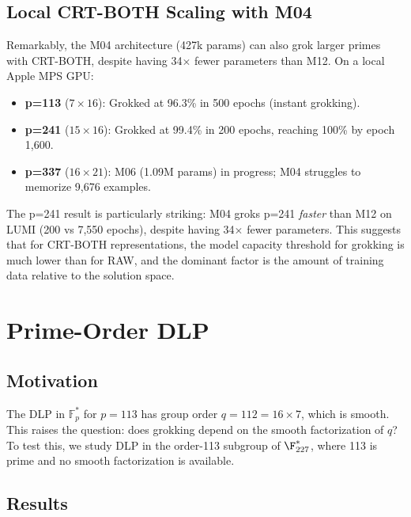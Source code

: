 \documentclass[11pt]{article}
\newcommand{\Fps}{\mathbb{F}_p^*}
\begin{document}
\subsection{Local CRT-BOTH Scaling with M04}
\label{sec:local_crt_scaling}

Remarkably, the M04 architecture (427k params) can also grok larger primes with CRT-BOTH, despite having 34$\times$ fewer parameters than M12. On a local Apple MPS GPU:

\begin{itemize}[leftmargin=*]
    \item \textbf{p=113} ($7 \times 16$): Grokked at 96.3\% in 500 epochs (instant grokking).
    \item \textbf{p=241} ($15 \times 16$): Grokked at 99.4\% in 200 epochs, reaching 100\% by epoch 1,600.
    \item \textbf{p=337} ($16 \times 21$): M06 (1.09M params) in progress; M04 struggles to memorize 9,676 examples.
\end{itemize}

The p=241 result is particularly striking: M04 groks p=241 \emph{faster} than M12 on LUMI (200 vs 7,550 epochs), despite having 34$\times$ fewer parameters. This suggests that for CRT-BOTH representations, the model capacity threshold for grokking is much lower than for RAW, and the dominant factor is the amount of training data relative to the solution space.



\section{Prime-Order DLP}
\label{sec:prime_order}

\subsection{Motivation}

The DLP in $\Fps$ for $p = 113$ has group order $q = 112 = 16 \times 7$, which is smooth. This raises the question: does grokking depend on the smooth factorization of $q$? To test this, we study DLP in the order-113 subgroup of $\F_{227}^*$, where 113 is prime and no smooth factorization is available.

\subsection{Results}
\end{document}
